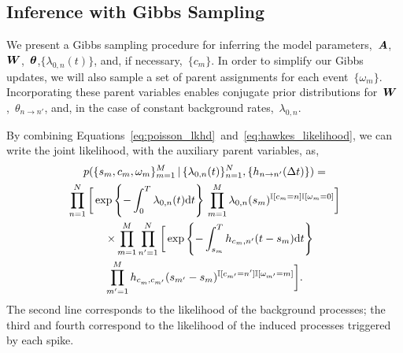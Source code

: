 \subsection{Inference with Gibbs Sampling}
We present a Gibbs sampling procedure for inferring the model
parameters,~$\boldsymbol{A}$,~$\boldsymbol{W}$,~$\boldsymbol{\theta}$,$\{\lambda_{0,n}(t)\}$, and, if
necessary,~${\{c_m\}}$. In order to simplify our Gibbs updates, we
will also sample a set of parent assignments for each
event~$\{\omega_m\}$. Incorporating these parent variables enables
conjugate prior distributions for~$\boldsymbol{W}$,~$\theta_{n \to n'}$, and, in
the case of constant background rates,~$\lambda_{0,n}$.

By combining
Equations~\ref{eq:poisson_lkhd}~and~\ref{eq:hawkes_likelihood}, we can
write the joint likelihood, with the auxiliary parent variables, as,
\begin{multline}
  \label{eq:complete_likelihood}
  p(\{s_m, c_m, \omega_m\}_{m=1}^M \,|\, \{\lambda_{0,n}(t)\}_{n=1}^N, \{h_{n \to n'}(\Delta t)\}) = \\
  \prod^N_{n=1} \bigg[
  \exp\left\{ -\int_0^T \lambda_{0,n}(t)\mathrm{d}t \right\} \,
  \prod^M_{m=1}
   \lambda_{0,n}(s_m)^{\mathbb{I}[c_m=n] \mathbb{I}[\omega_m = 0]} \bigg]\\
  \quad\times \prod_{m=1}^M \prod_{n'=1}^N \bigg[
  \exp\left\{-\int^T_{s_m} h_{c_m,n'}(t - s_m) \mathrm{d}t \right\} \\
  \prod_{m'=1}^M h_{c_m^{~},c_{m'}}(s_{m'}-s_m)^{\mathbb{I}[c_{m'}=n'] \mathbb{I}[\omega_{m'}=m]}\bigg].
\end{multline}
The second line corresponds to the likelihood of the background
processes; the third and fourth correspond to the likelihood of the
induced processes triggered by each spike.

